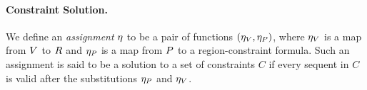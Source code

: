\paragraph{Constraint Solution.}
We define an \emph{assignment} $\eta$ to be a pair of functions $(\eta_V,\eta_P)$,
where $\eta_V$ is a map from $V$ to $R$
and $\eta_P$ is a map from $P$ to a region-constraint formula.
Such an assignment is said to be a solution to a set of constraints $C$ if
every sequent in $C$ is valid after the substitutions $\eta_P$ and $ \eta_V$.

%
%


